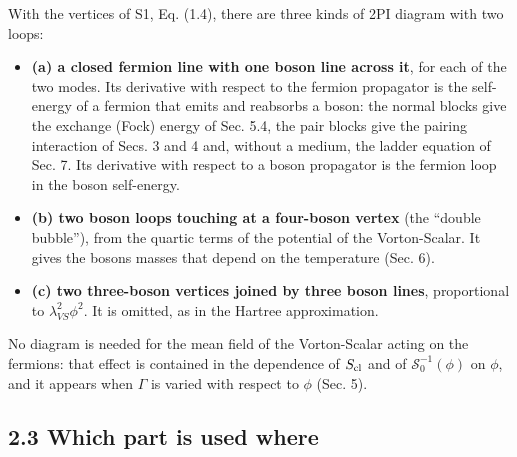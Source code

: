 \documentclass[
  10pt,
]{article}
\providecommand{\tightlist}{%
  \setlength{\itemsep}{0pt}\setlength{\parskip}{0pt}}
\begin{document}
With the vertices of S1, Eq. (1.4), there are three kinds of 2PI diagram
with two loops:

\begin{itemize}
\tightlist
\item
  \textbf{(a) a closed fermion line with one boson line across it}, for
  each of the two modes. Its derivative with respect to the fermion
  propagator is the self-energy of a fermion that emits and reabsorbs a
  boson: the normal blocks give the exchange (Fock) energy of Sec. 5.4,
  the pair blocks give the pairing interaction of Secs. 3 and 4 and,
  without a medium, the ladder equation of Sec. 7. Its derivative with
  respect to a boson propagator is the fermion loop in the boson
  self-energy.
\item
  \textbf{(b) two boson loops touching at a four-boson vertex} (the
  ``double bubble''), from the quartic terms of the potential of the
  Vorton-Scalar. It gives the bosons masses that depend on the
  temperature (Sec. 6).
\item
  \textbf{(c) two three-boson vertices joined by three boson lines},
  proportional to \(\lambda_{VS}^2\phi^2\). It is omitted, as in the
  Hartree approximation.
\end{itemize}

No diagram is needed for the mean field of the Vorton-Scalar acting on
the fermions: that effect is contained in the dependence of
\(S_{\rm cl}\) and of \(\mathcal S_0^{-1}(\phi)\) on \(\phi\), and it
appears when \(\Gamma\) is varied with respect to \(\phi\) (Sec. 5).

\hypertarget{which-part-is-used-where}{%
\subsection{2.3 Which part is used
where}\label{which-part-is-used-where}}
\end{document}
